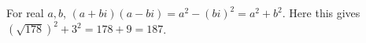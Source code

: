 For real $a,b$, $(a+bi)(a-bi)=a^2-(bi)^2=a^2+b^2$. Here this gives $\left(\sqrt{178}\right)^2+3^2=178+9=\boxed{187}$.
